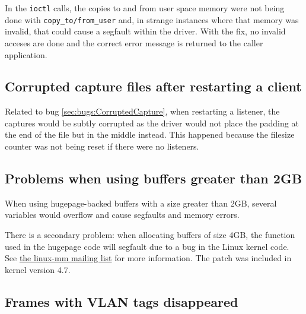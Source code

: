 \begin{bugdata}
\end{bugdata}

In the \texttt{ioctl} calls, the copies to and from user space memory were not being done with \texttt{copy\_to/from\_user} and, in strange instances where that memory was invalid, that could cause a segfault within the driver. With the fix, no invalid acceses are done and the correct error message is returned to the caller application.

\subsection{Corrupted capture files after restarting a client}

\begin{bugdata}
\end{bugdata}

Related to bug \ref{sec:bugs:CorruptedCapture}, when restarting a listener, the captures would be subtly corrupted as the driver would not place the padding at the end of the file but in the middle instead. This happened because the filesize counter was not being reset if there were no listeners.

\subsection{Problems when using buffers greater than 2GB}

\begin{bugdata}
\end{bugdata}

When using hugepage-backed buffers with a size greater than 2GB, several variables would overflow and cause segfaults and memory errors.

There is a secondary problem: when allocating buffers of size 4GB, the function  used in the hugepage code will segfault due to a bug in the Linux kernel code. See \href{http://marc.info/?l=linux-mm&m=146114962421719&w=2}{the linux-mm mailing list} for more information. The patch was included in kernel version 4.7.

\subsection{Frames with VLAN tags disappeared}

